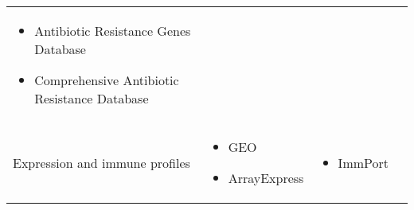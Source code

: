 \begin{tabular}{p{3.5cm} l l l}
\begin{minipage}[t]{3.5cm}
\begin{itemize}[noitemsep]
    \item Antibiotic Resistance Genes Database
    \item Comprehensive Antibiotic Resistance Database
    \end{itemize}
    \smallskip
  \end{minipage} &
  \\
  Expression and immune profiles &
  \begin{minipage}[t]{3.5cm}
    \raggedright
    \begin{itemize}[noitemsep]
    \item GEO
    \item ArrayExpress
    \end{itemize}
  \end{minipage} &
  \begin{minipage}[t]{3.5cm}
    \raggedright
    \begin{itemize}[noitemsep]
    \item ImmPort
    \end{itemize}
  \end{minipage} &
  \\
  \bottomrule
\end{tabular}